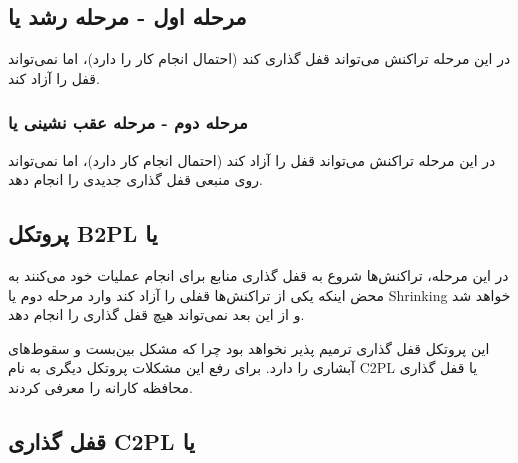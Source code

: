 \documentclass[a4paper]{article}
\begin{document}
\subsection*{مرحله اول - مرحله رشد یا }

در این مرحله تراکنش می‌تواند قفل گذاری کند (احتمال انجام کار را دارد)، اما
نمی‌تواند قفل را آزاد کند.

\subsubsection*{مرحله دوم - مرحله عقب نشینی یا }

در این مرحله تراکنش می‌تواند قفل را آزاد کند (احتمال انجام کار دارد)، اما
نمی‌تواند روی منبعی قفل گذاری جدیدی را انجام دهد.

\newpage

\subsection{پروتکل B2PL یا }

در این مرحله، تراکنش‌ها شروع به قفل گذاری منابع برای انجام عملیات خود می‌کنند به
محض اینکه یکی از تراکنش‌ها قفلی را آزاد کند وارد مرحله دوم یا Shrinking خواهد شد
و از این بعد نمی‌تواند هیچ قفل گذاری را انجام دهد.


\begin{LTR}
    \begin{table}[h]
        \begin{RTL}
            \caption{زمانبندی $S_{6}$}
        \end{RTL}
        \centering
    \end{table}
\end{LTR}

این پروتکل قفل گذاری ترمیم پذیر نخواهد بود چرا که مشکل بین‌بست و سقوط‌های آبشاری
را دارد. برای رفع این مشکلات پروتکل دیگری به نام C2PL یا قفل گذاری محافظه کارانه
را معرفی کردند.

\subsection{قفل گذاری C2PL یا }
\end{document}
